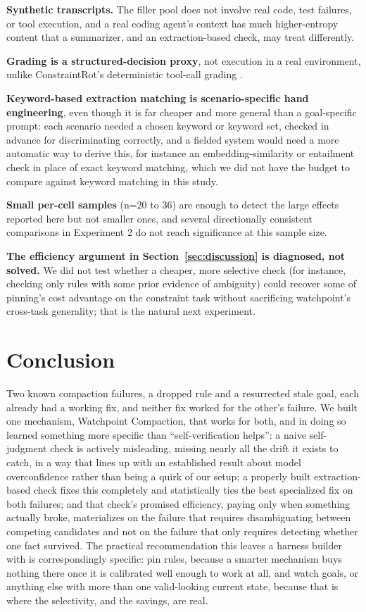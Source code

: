 \documentclass[11pt]{article}
\begin{document}
\textbf{Synthetic transcripts.} The filler pool does not involve real code, test failures, or tool execution, and a real coding agent's context has much higher-entropy content that a summarizer, and an extraction-based check, may treat differently.

\textbf{Grading is a structured-decision proxy}, not execution in a real environment, unlike ConstraintRot's deterministic tool-call grading \cite{governancedecay}.

\textbf{Keyword-based extraction matching is scenario-specific hand engineering}, even though it is far cheaper and more general than a goal-specific prompt: each scenario needed a chosen keyword or keyword set, checked in advance for discriminating correctly, and a fielded system would need a more automatic way to derive this, for instance an embedding-similarity or entailment check in place of exact keyword matching, which we did not have the budget to compare against keyword matching in this study.

\textbf{Small per-cell samples} (n=20 to 36) are enough to detect the large effects reported here but not smaller ones, and several directionally consistent comparisons in Experiment 2 do not reach significance at this sample size.

\textbf{The efficiency argument in Section~\ref{sec:discussion} is diagnosed, not solved.} We did not test whether a cheaper, more selective check (for instance, checking only rules with some prior evidence of ambiguity) could recover some of pinning's cost advantage on the constraint task without sacrificing watchpoint's cross-task generality; that is the natural next experiment.

\section{Conclusion}
\label{sec:conclusion}

Two known compaction failures, a dropped rule and a resurrected stale goal, each already had a working fix, and neither fix worked for the other's failure. We built one mechanism, Watchpoint Compaction, that works for both, and in doing so learned something more specific than ``self-verification helps'': a naive self-judgment check is actively misleading, missing nearly all the drift it exists to catch, in a way that lines up with an established result about model overconfidence rather than being a quirk of our setup; a properly built extraction-based check fixes this completely and statistically ties the best specialized fix on both failures; and that check's promised efficiency, paying only when something actually broke, materializes on the failure that requires disambiguating between competing candidates and not on the failure that only requires detecting whether one fact survived. The practical recommendation this leaves a harness builder with is correspondingly specific: pin rules, because a smarter mechanism buys nothing there once it is calibrated well enough to work at all, and watch goals, or anything else with more than one valid-looking current state, because that is where the selectivity, and the savings, are real.
\end{document}
